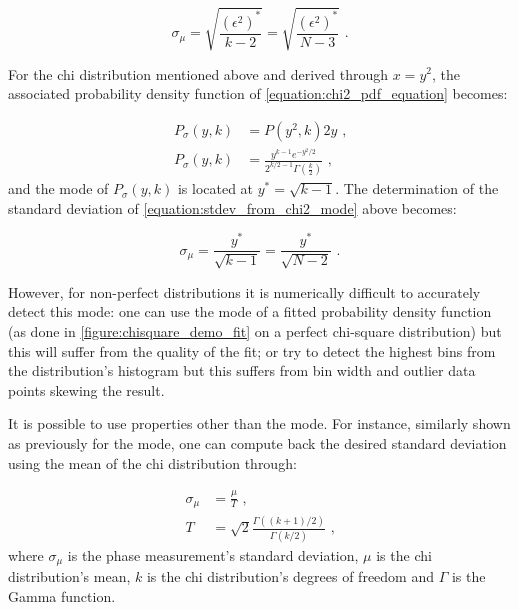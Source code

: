 \begin{equation}
    \sigma_{\mu} = \sqrt{\frac{(\epsilon^2)^*}{k - 2}} = \sqrt{\frac{(\epsilon^2)^*}{N - 3}} \text{ .}
    \label{equation:stdev_from_chi2_mode}
\end{equation}

For the chi distribution mentioned above and derived through \(x = y^2\), the associated probability density function of \cref{equation:chi2_pdf_equation} becomes:

\begin{equation}
    \begin{aligned}
        P_{\sigma}(y , k) &= P (y^2 , k) 2y \text{ ,} \\
        P_{\sigma}(y , k) &= \frac{y^{k-1} e^{-y^2/2}} {2^{k/2-1} \Gamma(\frac{k}{2})} \text{ ,}
    \end{aligned}
    \label{equation:chi_pdf}  
\end{equation}
and the mode of \(P_{\sigma}(y , k)\) is located at \(y^*=\sqrt{k-1}\).
The determination of the standard deviation of \cref{equation:stdev_from_chi2_mode} above becomes:

\begin{equation}
    \sigma_{\mu} = \frac{y^*}{\sqrt{k - 1}} = \frac{y^*}{\sqrt{N - 2}} \text{ .}
    \label{equation:stdev_from_chi_mode}
\end{equation}

However, for non-perfect distributions it is numerically difficult to accurately detect this mode: one can use the mode of a fitted probability density function (as done in \cref{figure:chisquare_demo_fit} on a perfect chi-square distribution) but this will suffer from the quality of the fit; or try to detect the highest bins from the distribution's histogram but this suffers from bin width and outlier data points skewing the result.

It is possible to use properties other than the mode.
For instance, similarly shown as previously for the mode, one can compute back the desired standard deviation using the mean of the chi distribution through:

\begin{equation}
	\begin{aligned}
        \sigma_{\mu} &= \frac{\mu}{T} \text{ ,} \\
        T            &= \sqrt{2} \frac{\Gamma((k + 1) / 2)}{\Gamma(k / 2)} \text{ ,}
	\end{aligned}	
    \label{equation:stdev_from_chi_mean}
\end{equation}
where \(\sigma_{\mu}\) is the phase measurement's standard deviation, \(\mu\) is the chi distribution's mean, \(k\) is the chi distribution's degrees of freedom and \(\Gamma\) is the Gamma function.
\newline

